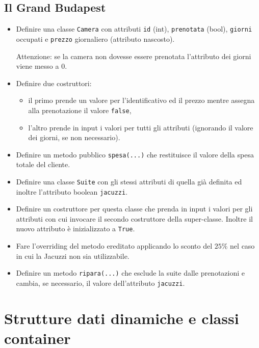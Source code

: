 \documentclass{article}
\begin{document}
\subsection{Il Grand Budapest}

\begin{itemize}

\item Definire una classe \texttt{Camera} con attributi \texttt{id} (int), \texttt{prenotata} (bool), \texttt{giorni} occupati e \texttt{prezzo} giornaliero (attributo nascosto). 

Attenzione: se la camera non dovesse essere prenotata l'attributo dei giorni viene messo a $0$.

\item Definire due costruttori:
	\begin{itemize}
	\item il primo prende un valore per l'identificativo ed il prezzo mentre assegna alla prenotazione il valore \texttt{false},
	\item l’altro prende in input i valori per tutti gli attributi (ignorando il valore dei giorni, se non necessario).
	\end{itemize}

\item Definire un metodo pubblico \texttt{spesa(...)} che restituisce il valore della spesa totale del cliente.

\item Definire una classe \texttt{Suite} con gli stessi attributi di quella gi\`a definita ed inoltre l'attributo boolean \texttt{jacuzzi}.

\item Definire un costruttore per questa classe che prenda in input i valori per gli attributi con cui invocare il secondo costruttore della super-classe. Inoltre il nuovo attributo \`e inizializzato a \texttt{True}.

\item Fare l'overriding del metodo ereditato applicando lo sconto del $25\%$ nel caso in cui la Jacuzzi non sia utilizzabile.

\item Definire un metodo \texttt{ripara(...)} che esclude la suite dalle prenotazioni e cambia, se necessario, il valore dell'attributo \texttt{jacuzzi}.

\end{itemize}



\section{Strutture dati dinamiche e classi container}
\end{document}
